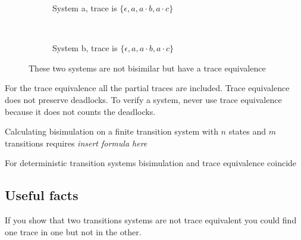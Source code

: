 \begin{figure}[H]
  \begin{subfigure}[b]{.4\textwidth}
    \centering
    \caption{System a, trace is \( \{ \epsilon, a, a \cdot b, a \cdot c \} \)}
  \end{subfigure}
  ~
  \begin{subfigure}[b]{.4\textwidth}
    \centering
    \caption{System b, trace is \( \{ \epsilon, a, a \cdot b, a \cdot c \} \)}
  \end{subfigure}

  \caption{These two systems are not bisimilar but have a trace equivalence}
\end{figure}

For the trace equivalence all the partial traces are included. Trace equivalence does not 
preserve deadlocks. To verify a system, never use trace equivalence because it does not counts 
the deadlocks.

Calculating bisimulation on a finite transition system with \( n \) states and \( m \) transitions
requires \emph{insert formula here}

\begin{displayquote}
For deterministic transition systems bisimulation and trace equivalence coincide
\end{displayquote}

\subsection{Useful facts}

If you show that two transitions systems are not trace equivalent you could find one trace in 
one but not in the other.

